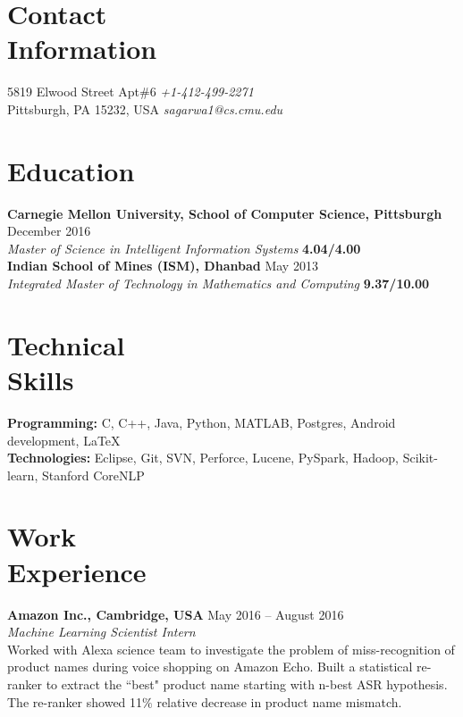 \documentclass[margin,line]{resume}
\begin{document}
\begin{resume}

\section{\mysidestyle Contact \\Information}
		5819 Elwood Street Apt\#6                       \hfill \textit{+1-412-499-2271} \\
		Pittsburgh, PA 15232, USA                   \hfill \textit{sagarwa1@cs.cmu.edu}

\section{\mysidestyle Education}
		\textbf{Carnegie Mellon University, School of Computer Science, Pittsburgh} \hfill December 2016 \\
		\textit{Master of Science in Intelligent Information Systems} \hfill  \textbf{4.04/4.00} \\
		\textbf{Indian School of Mines (ISM), Dhanbad} \hfill May 2013 \\
		\textit{Integrated Master of Technology in Mathematics and Computing} \hfill \textbf{9.37/10.00}

\section{\mysidestyle Technical\\Skills}
   		 	\textbf{Programming: }C, C++, Java, Python, MATLAB, Postgres, Android development, \LaTeX\\
            \textbf{Technologies: }Eclipse, Git, SVN, Perforce, Lucene, PySpark, Hadoop, Scikit-learn, Stanford CoreNLP

\section{\mysidestyle Work\\Experience}
    	\textbf{Amazon Inc., Cambridge, USA} \hfill May 2016 -- August 2016\\
		\textit{Machine Learning Scientist Intern}\\
		Worked with Alexa science team to investigate the problem of miss-recognition of product names during voice shopping on Amazon Echo. Built a statistical re-ranker to extract the ``best" product name starting with n-best ASR hypothesis. The re-ranker showed 11$\%$ relative decrease in product name mismatch. 
		 

\end{resume}
\end{document}
